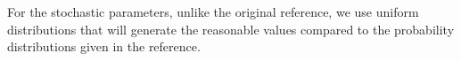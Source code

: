 For the stochastic parameters, unlike the original reference, we use uniform distributions that will generate the reasonable values compared to the probability distributions given in the reference.

